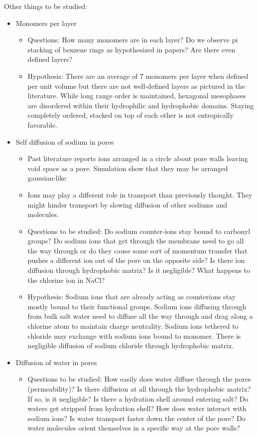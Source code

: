\documentclass{article}
\begin{document}
Other things to be studied:
\begin{itemize}
	\item Monomers per layer
	\begin{itemize}
		\item Questions: How many monomers are in each layer? Do we observe pi stacking of benzene rings as hypothesized in papers? Are there even defined layers?
		\item Hypothesis: There are an average of 7 monomers per layer when defined per unit volume but there are not well-defined layers as pictured in the literature. While long range order is maintained, hexagonal mesophases are disordered within their hydrophilic and hydrophobic domains. Staying completely ordered, stacked on top of each other is not entropically favorable.
	\end{itemize}
	\item Self diffusion of sodium in pores
	\begin{itemize}
		\item Past literature reports ions arranged in a circle about pore walls leaving void space as a pore. Simulation show that they may be arranged gaussian-like	
		\item Ions may play a different role in transport than previously thought. They might hinder transport by slowing diffusion of other sodiums and molecules. 
		\item Questions to be studied: Do sodium counter-ions stay bound to carbonyl groups? Do sodium ions that get through the membrane need to go all the way through or do they cause some sort of momentum transfer that pushes a different ion out of the pore on the opposite side? Is there ion diffusion through hydrophobic matrix? Is it negligible? What happens to the chlorine ion in NaCl?
		\item Hypothesis: Sodium ions that are already acting as counterions stay mostly bound to their functional groups. Sodium ions diffusing through from bulk salt water need to diffuse all the way through and drag along a chlorine atom to maintain charge neutrality. Sodium ions tethered to chloride may exchange with sodium ions bound to monomer. There is negligible diffusion of sodium chloride through hydrophobic matrix.
	\end{itemize}
	\item Diffusion of water in pores
	\begin{itemize}
		\item Questions to be studied: How easily does water diffuse through the pores (permeability)? Is there diffusion at all through the hydrophobic matrix? If so, is it negligible? Is there a hydration shell around entering salt? Do waters get stripped from hydration shell? How does water interact with sodium ions? Is water transport faster down the center of the pore? Do water molecules orient themselves in a specific way at the pore walls?

\end{itemize}
\end{itemize}
\end{document}
